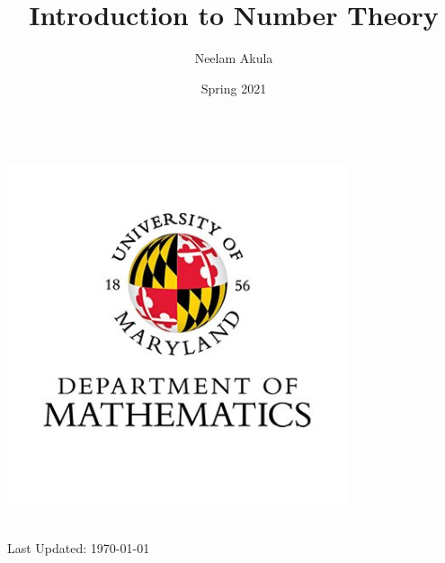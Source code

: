 \documentclass[fullpage]{article}
\title{Introduction to Number Theory}
\author{Neelam Akula}
\date{Spring 2021}
\newif\ifintro
\begin{document}
\makeatletter
    \begin{titlepage}
        \begin{center}
            {\huge \bfseries  \@title }\\[4ex]
			\includegraphics[width=10cm]{logo.png}\\[4ex]
            {\large  \@author}\\[4ex] 
            {\large \@date}
        \end{center}
        \vfill
        Last Updated: \today
    \end{titlepage}
\makeatother

\setcounter{tocdepth}{2}
\tableofcontents
\newpage

\ifintro
\section*{Introduction}
\rule{\textwidth}{1pt}
\vspace{1.5in}
\paragraph{}
    This is a compilation of notes and homeworks for MATH 406,
    Introduction to Number Theory, to aid both current and future students
    in fully understanding the material. 
    The primary text used is \emph{Elementary Number Theory}, by Kenneth H. Rosen, 6th
    Edition. While the text is not required it is an excellent resource for additional
    problems. Chapters covered from the text are 1, 3, 4, 6, 7, 9, 11, and 8 in that order. With two
    midterms following chapters 1, 3, 4 and chapters 6, 7, 9. The final is cumulative with an
    emphasis on chapters 8 and 11.
    Lastly, the course is taught by Dr. Justin Wyss-Gallifent, on his personal site there are
    brief versions of each section's lecture notes. A list of his notes can be found
    \href{https://www.math.umd.edu/~immortal/MATH406/}{here}.
\addcontentsline{toc}{section}{Introduction}
\newpage
\fi
\end{document}
